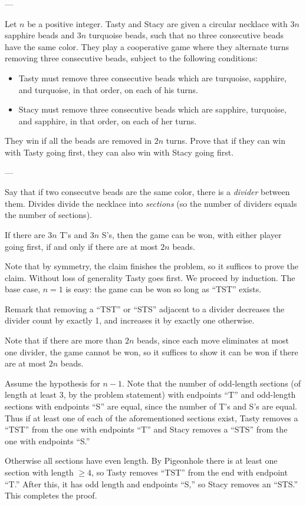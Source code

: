 
---

Let $n$ be a positive integer. Tasty and Stacy are given a circular necklace with $3n$ sapphire beads and $3n$ turquoise beads, such that no three consecutive beads have the same color. They play a cooperative game where they alternate turns removing three consecutive beads, subject to the following conditions:
\begin{itemize}
    \item Tasty must remove three consecutive beads which are turquoise, sapphire, and turquoise, in that order, on each of his turns.
    \item Stacy must remove three consecutive beads which are sapphire, turquoise, and sapphire, in that order, on each of her turns.
\end{itemize}
They win if all the beads are removed in $2n$ turns. Prove that if they can win with Tasty going first, they can also win with Stacy going first.

---

Say that if two consecutve beads are the same color, there is a \emph{divider} between them. Divides divide the necklace into \emph{sections} (so the number of dividers equals the number of sections).
\begin{iclaim*}
    If there are $3n$ T's and $3n$ S's, then the game can be won, with either player going first, if and only if there are at most $2n$ beads.
\end{iclaim*}
Note that by symmetry, the claim finishes the problem, so it suffices to prove the claim. Without loss of generality Tasty goes first. We proceed by induction. The base case, $n=1$ is easy: the game can be won so long as ``TST'' exists.

Remark that removing a ``TST'' or ``STS'' adjacent to a divider decreases the divider count by exactly 1, and increases it by exactly one otherwise.

Note that if there are more than $2n$ beads, since each move eliminates at most one divider, the game cannot be won, so it suffices to show it can be won if there are at most $2n$ beads.

Assume the hypothesis for $n-1$. Note that the number of odd-length sections (of length at least $3$, by the problem statement) with endpoints ``T'' and odd-length sections with endpoints ``S'' are equal, since the number of T's and S's are equal. Thus if at least one of each of the aforementioned sections exist, Tasty removes a ``TST'' from the one with endpoints ``T'' and Stacy removes a ``STS'' from the one with endpoints ``S.''

Otherwise all sections have even length. By Pigeonhole there is at least one section with length $\ge4$, so Tasty removes ``TST'' from the end with endpoint ``T.'' After this, it has odd length and endpoints ``S,'' so Stacy removes an ``STS.'' This completes the proof.

